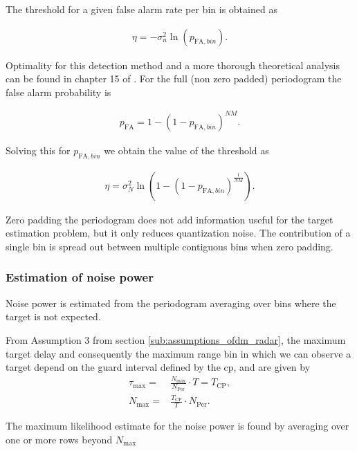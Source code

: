 				The threshold for a given false alarm rate per bin is obtained as
				
				\begin{align*}
					\eta = -\sigma_n^2 \ln(p_{\text{FA},bin}) .
				\end{align*} 
				
				Optimality for this detection method and a more thorough theoretical analysis can be found in chapter 15 of \cite{Richards_Scheer_Holm_2010}.
				For the full (non zero padded) periodogram the false alarm probability is
				
				\begin{align*}
					p_\text{FA} = 1 - (1 - p_{\text{FA},bin})^{NM}.
				\end{align*}
				
				Solving this for $p_{\text{FA},bin}$ we obtain the value of the threshold as 
				
				\begin{align*}
					\eta = \sigma_N^2 \ln{(1 - (1 - p_{\text{FA},bin})^{\frac{1}{NM}})}.
				\end{align*}
				
				Zero padding the periodogram does not add information useful for the target estimation problem, but it only reduces quantization noise. The contribution of a single bin is spread out between multiple contiguous bins when zero padding.

				\subsubsection{Estimation of noise power}
	
					Noise power is estimated from the periodogram averaging over bins where the target is not expected.
					
					From Assumption 3 from section \ref{sub:assumptions_ofdm_radar}, the maximum target delay and consequently the maximum range bin in which we can observe a target depend on the guard interval defined by the \gls{cp}, and are given by
					\begin{align*}
						\tau_{\text{max}} =& \frac{N_{\text{max}}}{N_{\text{Per}}}\cdot T = T_\text{CP} ,\\
						N_{\text{max}} =& \frac{T_\text{CP}}{T}\cdot N_{\text{Per}}.
					\end{align*} 
					
					The maximum likelihood estimate for the noise power is found by averaging over one or more rows beyond $N_{\text{max}}$
			
